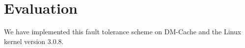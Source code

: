 \section{Evaluation}
\label{sec:evaluation}

We have implemented this fault tolerance scheme on DM-Cache and the
Linux kernel version 3.0.8.
